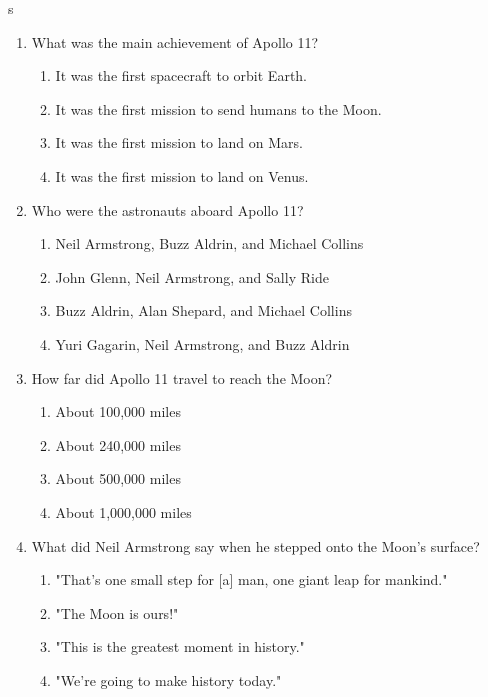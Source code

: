 s\documentclass[12pt]{article}
\begin{document}
\begin{enumerate}

    \item What was the main achievement of Apollo 11?
    \begin{enumerate}[label=\Alph*.]
        \item It was the first spacecraft to orbit Earth.
        \item It was the first mission to send humans to the Moon.
        \item It was the first mission to land on Mars.
        \item It was the first mission to land on Venus.
    \end{enumerate}
    \vspace{0.5cm}

    \item Who were the astronauts aboard Apollo 11?
    \begin{enumerate}[label=\Alph*.]
        \item Neil Armstrong, Buzz Aldrin, and Michael Collins
        \item John Glenn, Neil Armstrong, and Sally Ride
        \item Buzz Aldrin, Alan Shepard, and Michael Collins
        \item Yuri Gagarin, Neil Armstrong, and Buzz Aldrin
    \end{enumerate}
    \vspace{0.5cm}

    \item How far did Apollo 11 travel to reach the Moon?
    \begin{enumerate}[label=\Alph*.]
        \item About 100,000 miles
        \item About 240,000 miles
        \item About 500,000 miles
        \item About 1,000,000 miles
    \end{enumerate}
    \vspace{0.5cm}

    \item What did Neil Armstrong say when he stepped onto the Moon's surface?
    \begin{enumerate}[label=\Alph*.]
        \item "That's one small step for [a] man, one giant leap for mankind."
        \item "The Moon is ours!"
        \item "This is the greatest moment in history."
        \item "We're going to make history today."
    \end{enumerate}
    \vspace{0.5cm}


\end{enumerate}
\end{document}
